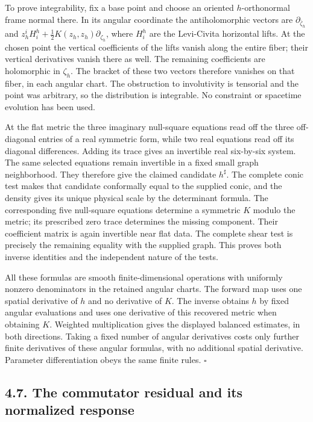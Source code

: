 \documentclass[
  english,
  11pt,
  reqno]{amsart}
\begin{document}
To prove integrability, fix a base point and choose an oriented
\(h\)-orthonormal frame normal there. In its angular coordinate the
antiholomorphic vectors are \(\partial_{\bar\zeta_h}\) and
\(z_h^iH_i^h+\tfrac12K(z_h,z_h)\partial_{\zeta_h}\), where \(H_i^h\) are
the Levi-Civita horizontal lifts. At the chosen point the vertical
coefficients of the lifts vanish along the entire fiber; their vertical
derivatives vanish there as well. The remaining coefficients are
holomorphic in \(\zeta_h\). The bracket of these two vectors therefore
vanishes on that fiber, in each angular chart. The obstruction to
involutivity is tensorial and the point was arbitrary, so the
distribution is integrable. No constraint or spacetime evolution has
been used.

At the flat metric the three imaginary null-square equations read off
the three off-diagonal entries of a real symmetric form, while two real
equations read off its diagonal differences. Adding its trace gives an
invertible real six-by-six system. The same selected equations remain
invertible in a fixed small graph neighborhood. They therefore give the
claimed candidate \(h^\sharp\). The complete conic test makes that
candidate conformally equal to the supplied conic, and the density gives
its unique physical scale by the determinant formula. The corresponding
five null-square equations determine a symmetric \(K\) modulo the
metric; its prescribed zero trace determines the missing component.
Their coefficient matrix is again invertible near flat data. The
complete shear test is precisely the remaining equality with the
supplied graph. This proves both inverse identities and the independent
nature of the tests.

All these formulas are smooth finite-dimensional operations with
uniformly nonzero denominators in the retained angular charts. The
forward map uses one spatial derivative of \(h\) and no derivative of
\(K\). The inverse obtains \(h\) by fixed angular evaluations and uses
one derivative of this recovered metric when obtaining \(K\). Weighted
multiplication gives the displayed balanced estimates, in both
directions. Taking a fixed number of angular derivatives costs only
further finite derivatives of these angular formulas, with no additional
spatial derivative. Parameter differentiation obeys the same finite
rules. \hfill\(\square\)

\subsection{4.7. The commutator residual and its normalized
response}\label{the-commutator-residual-and-its-normalized-response}\label{sec:online-source-curvature-residual}
\end{document}
